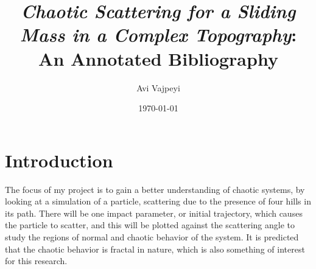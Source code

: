 \documentclass[11pt]{article}	%
\begin{document}
\title{{\textit{Chaotic Scattering for a Sliding Mass in a Complex Topography}}: An Annotated Bibliography}	%
\author{Avi Vajpeyi}
\date{\today}		%

\maketitle

\section{Introduction}
The focus of my project is to gain a better understanding of chaotic systems, by looking at a simulation of a particle, scattering due to the presence of four hills in its path. There will be one impact parameter, or initial trajectory, which causes the particle to scatter, and this will be plotted against the scattering angle to study the regions of normal and chaotic behavior of the system. It is predicted that the chaotic behavior is fractal in nature, which is also something of interest for this research.

\nocite{*} 	%



\end{document}
